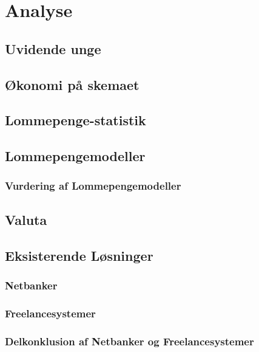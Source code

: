 \chapter{Analyse}

\section{Uvidende unge}
\label{UvidendeUnge}

\section{Økonomi på skemaet}
\label{Okonomi}

\section{Lommepenge-statistik}
\label{LommeStat}

\section{Lommepengemodeller}
\label{LommeModeller}
\subsection{Vurdering af Lommepengemodeller}
\label{ModelVurdering}

\section{Valuta}
\label{Valuta}

\section{Eksisterende Løsninger}
\subsection{Netbanker}
\subsection{Freelancesystemer}
\subsection{Delkonklusion af Netbanker og Freelancesystemer}
\label{DelkonklusionNetFree}
